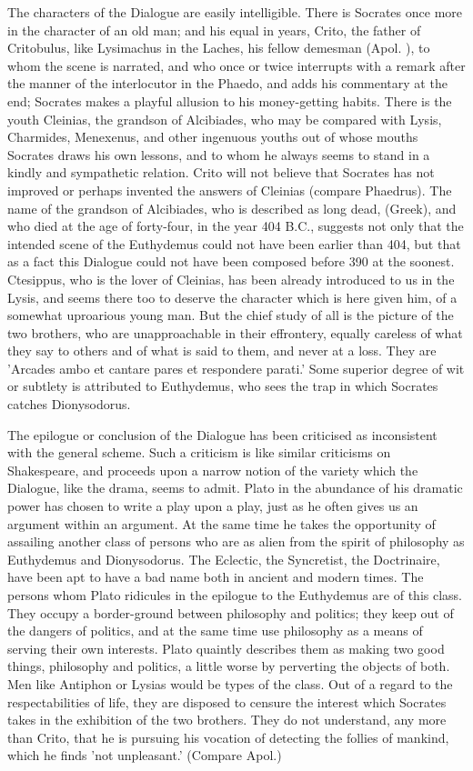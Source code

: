 \documentclass[11pt,letter]{article}
\begin{document}
\par  The characters of the Dialogue are easily intelligible. There is Socrates once more in the character of an old man; and his equal in years, Crito, the father of Critobulus, like Lysimachus in the Laches, his fellow demesman (Apol. ), to whom the scene is narrated, and who once or twice interrupts with a remark after the manner of the interlocutor in the Phaedo, and adds his commentary at the end; Socrates makes a playful allusion to his money-getting habits. There is the youth Cleinias, the grandson of Alcibiades, who may be compared with Lysis, Charmides, Menexenus, and other ingenuous youths out of whose mouths Socrates draws his own lessons, and to whom he always seems to stand in a kindly and sympathetic relation. Crito will not believe that Socrates has not improved or perhaps invented the answers of Cleinias (compare Phaedrus). The name of the grandson of Alcibiades, who is described as long dead, (Greek), and who died at the age of forty-four, in the year 404 B.C., suggests not only that the intended scene of the Euthydemus could not have been earlier than 404, but that as a fact this Dialogue could not have been composed before 390 at the soonest. Ctesippus, who is the lover of Cleinias, has been already introduced to us in the Lysis, and seems there too to deserve the character which is here given him, of a somewhat uproarious young man. But the chief study of all is the picture of the two brothers, who are unapproachable in their effrontery, equally careless of what they say to others and of what is said to them, and never at a loss. They are 'Arcades ambo et cantare pares et respondere parati.' Some superior degree of wit or subtlety is attributed to Euthydemus, who sees the trap in which Socrates catches Dionysodorus.

\par  The epilogue or conclusion of the Dialogue has been criticised as inconsistent with the general scheme. Such a criticism is like similar criticisms on Shakespeare, and proceeds upon a narrow notion of the variety which the Dialogue, like the drama, seems to admit. Plato in the abundance of his dramatic power has chosen to write a play upon a play, just as he often gives us an argument within an argument. At the same time he takes the opportunity of assailing another class of persons who are as alien from the spirit of philosophy as Euthydemus and Dionysodorus. The Eclectic, the Syncretist, the Doctrinaire, have been apt to have a bad name both in ancient and modern times. The persons whom Plato ridicules in the epilogue to the Euthydemus are of this class. They occupy a border-ground between philosophy and politics; they keep out of the dangers of politics, and at the same time use philosophy as a means of serving their own interests. Plato quaintly describes them as making two good things, philosophy and politics, a little worse by perverting the objects of both. Men like Antiphon or Lysias would be types of the class. Out of a regard to the respectabilities of life, they are disposed to censure the interest which Socrates takes in the exhibition of the two brothers. They do not understand, any more than Crito, that he is pursuing his vocation of detecting the follies of mankind, which he finds 'not unpleasant.' (Compare Apol.)
\end{document}
